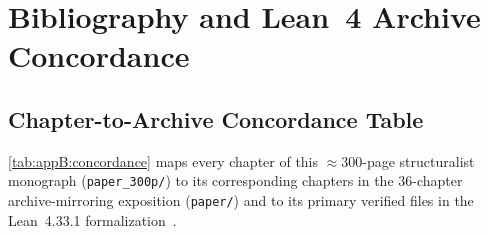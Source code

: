 \chapter{Bibliography and Lean~4 Archive Concordance}
\label{app:B}

\section{Chapter-to-Archive Concordance Table}
\label{sec:appB:concordance}

\cref{tab:appB:concordance} maps every chapter of this $\approx 300$-page structuralist monograph (\texttt{paper\_300p/}) to its corresponding chapters in the $36$-chapter archive-mirroring exposition (\texttt{paper/}) and to its primary verified files in the Lean~4.33.1 formalization~\cite{Alpoge2026}.


